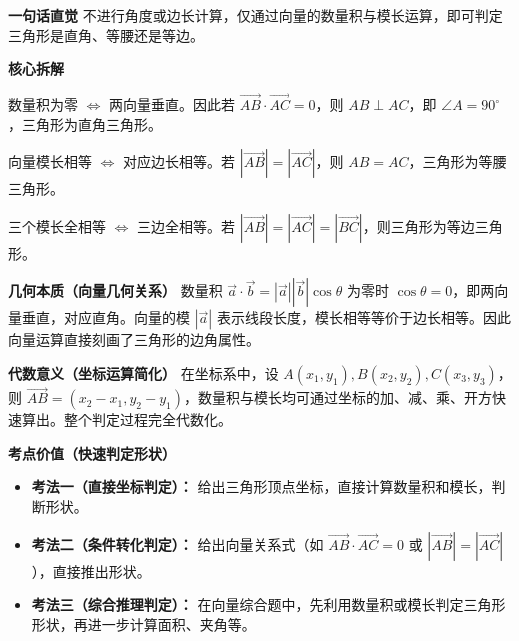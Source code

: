 \begin{explanationbox}
	\textbf{\textcolor{CExplanation}{一句话直觉}}
	不进行角度或边长计算，仅通过向量的数量积与模长运算，即可判定三角形是直角、等腰还是等边。

	\medskip
	\textbf{\textcolor{CExplanation}{核心拆解}}
	\begin{description}[style=nextline, leftmargin=2.8em, labelsep=0.5em, itemsep=0.45em]
		\item[\textbf{要点一（数量积定直角）：}]
			数量积为零 $\Longleftrightarrow$ 两向量垂直。因此若 $\overrightarrow{AB}\cdot\overrightarrow{AC}=0$，则 $AB\perp AC$，即 $\angle A=90^\circ$，三角形为直角三角形。
		\item[\textbf{要点二（模长定等腰）：}]
			向量模长相等 $\Longleftrightarrow$ 对应边长相等。若 $|\overrightarrow{AB}|=|\overrightarrow{AC}|$，则 $AB=AC$，三角形为等腰三角形。
		\item[\textbf{要点三（模长全等定等边）：}]
			三个模长全相等 $\Longleftrightarrow$ 三边全相等。若 $|\overrightarrow{AB}|=|\overrightarrow{AC}|=|\overrightarrow{BC}|$，则三角形为等边三角形。
	\end{description}

	\medskip
	\textbf{\textcolor{CExplanation}{几何本质（向量几何关系）}}
	数量积 $\vec{a}\cdot\vec{b}=|\vec{a}||\vec{b}|\cos\theta$ 为零时 $\cos\theta=0$，即两向量垂直，对应直角。向量的模 $|\vec{a}|$ 表示线段长度，模长相等等价于边长相等。因此向量运算直接刻画了三角形的边角属性。

	\medskip
	\textbf{\textcolor{CExplanation}{代数意义（坐标运算简化）}}
	在坐标系中，设 $A(x_1,y_1),B(x_2,y_2),C(x_3,y_3)$，则 $\overrightarrow{AB}=(x_2-x_1,y_2-y_1)$，数量积与模长均可通过坐标的加、减、乘、开方快速算出。整个判定过程完全代数化。

	\medskip
	\textbf{\textcolor{CExplanation}{考点价值（快速判定形状）}}
	\begin{itemize}[leftmargin=*, itemsep=0.5em, topsep=0.4em]
		\item \textbf{考法一（直接坐标判定）：} 给出三角形顶点坐标，直接计算数量积和模长，判断形状。
		\item \textbf{考法二（条件转化判定）：} 给出向量关系式（如 $\overrightarrow{AB}\cdot\overrightarrow{AC}=0$ 或 $|\overrightarrow{AB}|=|\overrightarrow{AC}|$），直接推出形状。
		\item \textbf{考法三（综合推理判定）：} 在向量综合题中，先利用数量积或模长判定三角形形状，再进一步计算面积、夹角等。
	\end{itemize}


\end{explanationbox}
